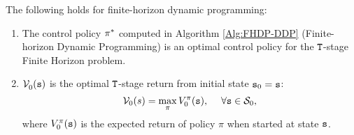 \begin{proposition}
The following holds for finite-horizon dynamic programming:
\begin{enumerate}
  \item
The control policy $\pi^* $ computed in Algorithm
\ref{Alg:FHDP-DDP} (Finite-horizon Dynamic Programming) is an optimal control policy for the
${\tt T}$-stage Finite Horizon problem.
  \item $\mathcal{V}_0^{}({\tt s})$ is the optimal ${\tt T}$-stage return from initial state ${{\tt s}_0} = {\tt s}$:
\[{\mathcal{V}_0}(s) = \mathop {\max }\limits_\pi  {V^\pi_0}({\tt s}),\;\quad \forall {\tt s} \in {\mathcal{S}_0},\]
where $V^\pi_0({\tt s})$ is the expected return of policy $\pi$
when started at state ${\tt s}$.
\end{enumerate}
\end{proposition}

